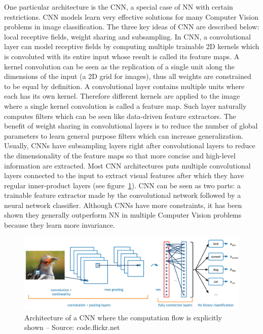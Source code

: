\documentclass[a4paper,12pt]{report}
\begin{document}
One particular architecture is the CNN, a special case of NN with certain restrictions.
CNN models learn very effective solutions for many Computer Vision problems in image classification.
The three key ideas of CNN are described below: local receptive fields, weight sharing and subsampling.
In CNN, a convolutional layer can model receptive fields by computing multiple trainable 2D kernels which is convoluted with its entire input whose result is called its feature maps.
A kernel convolution can be seen as the replication of a single unit along the dimensions of the input (a 2D grid for images), thus all weights are constrained to be equal by definition.
A convolutional layer contains multiple units where each has its own kernel.
Therefore different kernels are applied to the image where a single kernel convolution is called a feature map.
Such layer naturally computes filters which can be seen like data-driven feature extractors.
The benefit of weight sharing in convolutional layers is to reduce the number of global parameters to learn general purpose filters which can increase generalization.
Usually, CNNs have subsampling layers right after convolutional layers to reduce the dimensionality of the feature maps so that more concise and high-level information are extracted.
Most CNN architectures puts multiple convolutional layers connected to the input to extract visual features after which they have regular inner-product layers (see figure~\ref{fig:convnet}).
CNN can be seen as two parts: a trainable feature extractor made by the convolutional network followed by a neural network classifier.
Although CNNs have more constraints, it has been shown they generally outperform NN in multiple Computer Vision problems because they learn more invariance\cite{simard2003best}\cite{mnist_web}\cite{lawrence1997face}\cite{krizhevsky2012imagenet}.

\begin{figure}[t]
    \begin{center}
        \includegraphics[width=\textwidth]{thesis_figures/conv-net2.jpg}
    \end{center}
    \caption{Architecture of a CNN where the computation flow is explicitly shown -- Source: code.flickr.net}
    \label{fig:convnet}
\end{figure}
\end{document}
